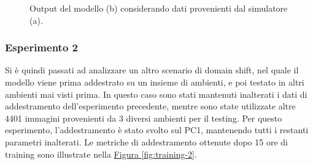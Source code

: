\documentclass[12pt]{report}
\begin{document}
\begin{figure}[h!]
	\centering
	\hspace{0.01\textwidth}
	\hspace{0.01\textwidth}
	\caption{Output del modello (b) considerando dati provenienti dal simulatore (a).}
	\label{fig:prediction-1}
\end{figure}

\subsubsection{Esperimento 2}
\label{sec:esperimento_2}

Si è quindi passati ad analizzare un altro scenario di domain shift, nel quale il modello viene prima addestrato su un insieme di ambienti, e poi testato in altri ambienti mai visti prima. In questo caso sono stati mantenuti inalterati i dati di addestramento dell'esperimento precedente, mentre sono state utilizzate altre 4401 immagini provenienti da 3 diversi ambienti per il testing. Per questo esperimento, l'addestramento è stato svolto sul PC1, mantenendo tutti i restanti parametri inalterati. Le metriche di addestramento ottenute dopo 15 ore di training sono illustrate nella \hyperref[fig:training-2]{Figura \ref{fig:training-2}}.
\end{document}
